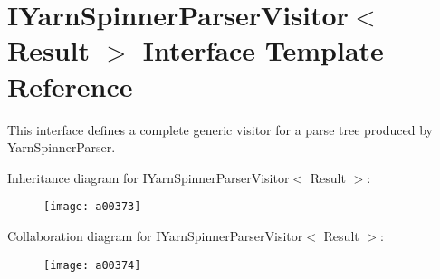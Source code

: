 \hypertarget{a00119}{\section{I\-Yarn\-Spinner\-Parser\-Visitor$<$ Result $>$ Interface Template Reference}
\label{a00119}
}


This interface defines a complete generic visitor for a parse tree produced by Yarn\-Spinner\-Parser.  




Inheritance diagram for I\-Yarn\-Spinner\-Parser\-Visitor$<$ Result $>$\-:
\nopagebreak
\begin{figure}[H]
\begin{center}
\leavevmode
\texttt{[image: a00373]}
\end{center}
\end{figure}


Collaboration diagram for I\-Yarn\-Spinner\-Parser\-Visitor$<$ Result $>$\-:
\nopagebreak
\begin{figure}[H]
\begin{center}
\leavevmode
\texttt{[image: a00374]}
\end{center}
\end{figure}
